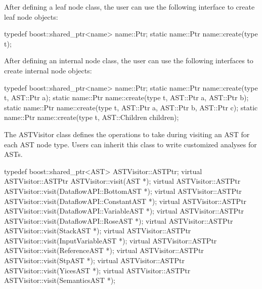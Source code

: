 After defining a leaf node class, the user can use the following interface to
create leaf node objects:

\begin{apient}
typedef boost::shared_ptr<name> name::Ptr;			
static name::Ptr name::create(type t);
\end{apient}

After defining an internal node class, the user can use the following interfaces to
create internal node objects:

\begin{apient}
typedef boost::shared_ptr<name> name::Ptr;			
static name::Ptr name::create(type t, AST::Ptr a);
static name::Ptr name::create(type t, AST::Ptr a, AST::Ptr b);
static name::Ptr name::create(type t, AST::Ptr a, AST::Ptr b, AST::Ptr c);
static name::Ptr name::create(type t, AST::Children children);
\end{apient}


The ASTVisitor class defines the operations to take during visiting an AST for
each AST node type. Users can inherit this class to write customized analyses
for ASTs.

\begin{apient}
typedef boost::shared_ptr<AST> ASTVisitor::ASTPtr;
virtual ASTVisitor::ASTPtr ASTVisitor::visit(AST *);
virtual ASTVisitor::ASTPtr ASTVisitor::visit(DataflowAPI::BottomAST *);
virtual ASTVisitor::ASTPtr ASTVisitor::visit(DataflowAPI::ConstantAST *);
virtual ASTVisitor::ASTPtr ASTVisitor::visit(DataflowAPI::VariableAST *);
virtual ASTVisitor::ASTPtr ASTVisitor::visit(DataflowAPI::RoseAST *);
virtual ASTVisitor::ASTPtr ASTVisitor::visit(StackAST *);
virtual ASTVisitor::ASTPtr ASTVisitor::visit(InputVariableAST *);
virtual ASTVisitor::ASTPtr ASTVisitor::visit(ReferenceAST *);
virtual ASTVisitor::ASTPtr ASTVisitor::visit(StpAST *);
virtual ASTVisitor::ASTPtr ASTVisitor::visit(YicesAST *);
virtual ASTVisitor::ASTPtr ASTVisitor::visit(SemanticsAST *);
\end{apient}

